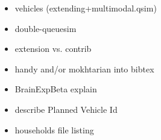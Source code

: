 \begin{itemize}
\item vehicles (extending+multimodal.qsim)

\item double-queuesim

\item extension vs. contrib

\item handy and/or mokhtarian into bibtex

\item BrainExpBeta explain

\item describe Planned Vehicle Id

\item households file listing




\end{itemize}